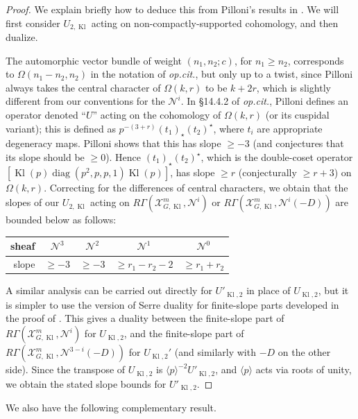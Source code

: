 \documentclass[cjm]{ipart}
\theoremstyle{plain}
\theoremstyle{remark}
\DeclareMathOperator{\diag}{diag}
\DeclareMathOperator{\Kl}{Kl}
\newcommand{\cN}{\mathcal{N}}
\newcommand{\cX}{\mathcal{X}}
\numberwithin{equation}{subsection}
\renewcommand{\ge}{\geqslant}
\begin{document}
  \begin{proof}
   We explain briefly how to deduce this from Pilloni's results in \cite{pilloni20}. We will first consider $U_{2, \Kl}$ acting on non-compactly-supported cohomology, and then dualize.
   
   The automorphic vector bundle of weight $(n_1, n_2; c)$, for $n_1 \ge n_2$, corresponds to $\Omega(n_1-n_2, n_2)$ in the notation of \emph{op.cit.}, but only up to a twist, since Pilloni always takes the central character of $\Omega(k, r)$ to be $k + 2r$, which is slightly different from our conventions for the $\cN^i$. In \S14.4.2 of \emph{op.cit.}, Pilloni defines an operator denoted ``$U$'' acting on the cohomology of $\Omega(k, r)$ (or its cuspidal variant); this is defined as $p^{-(3 + r)} (t_1)_\star (t_2)^\star$, where $t_i$ are appropriate degeneracy maps. Pilloni shows that this has slope $\ge -3$ (and conjectures that its slope should be $\ge 0$). Hence $(t_1)_\star (t_2)^\star$, which is the double-coset operator $\left[ \Kl(p) \diag(p^2, p, p, 1) \Kl(p)\right]$, has slope $\ge r$ (conjecturally $\ge r + 3$) on $\Omega(k, r)$. Correcting for the differences of central characters, we obtain that the slopes of our $U_{2, \Kl}$ acting on $R\Gamma\left(\cX_{G,\Kl}^m, \cN^i\right)$ or $R\Gamma\left(\cX_{G,\Kl}^m, \cN^i(-D)\right)$ are bounded below as follows:\medskip
   
   \noindent\begin{tabular}{r|c|c|c|c}
    sheaf & $\cN^3$ & $\cN^2$ & $\cN^1$ & $\cN^0$ \\
    \hline
    slope & $\ge -3$ & $\ge -3$ & $\ge r_1 - r_2 -2$ & $\ge r_1 + r_2$
   \end{tabular}
   \medskip
   
   A similar analysis can be carried out directly for $U'_{\Kl, 2}$ in place of $U_{\Kl, 2}$, but it is simpler to use the version of Serre duality for finite-slope parts developed in the proof of \cite[Theorem 5.7.2]{boxerpilloni20}. This gives a duality between the finite-slope part of $R\Gamma\left(\cX_{G,\Kl}^m, \cN^i\right)$ for $U_{\Kl, 2}$, and the finite-slope part of $R\Gamma\left(\cX_{G,\Kl}^m, \cN^{3-i}(-D)\right)$ for $U_{\Kl, 2}'$ (and similarly with $-D$ on the other side). Since the transpose of $U_{\Kl, 2}$ is $\langle p \rangle^{-2} U'_{\Kl, 2}$, and $\langle p \rangle$ acts via roots of unity, we obtain the stated slope bounds for $U'_{\Kl, 2}$.
  \end{proof}

  We also have the following complementary result. 
  
\end{document}
